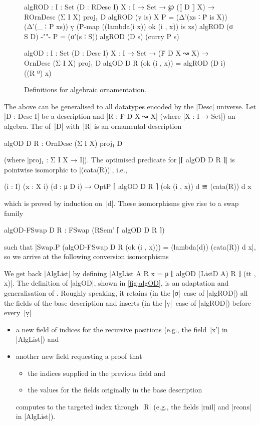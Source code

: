 \begin{figure}
\codefigure
\begin{code}
algROD :  {I : Set} (D : RDesc I) {X : I → Set} →
          ℘ (⟦ D ⟧ X) → ROrnDesc (Σ I X) proj₁ D
algROD (ṿ is)   {X}     P =  (Δ'(xs ∶ Ṗ is X)) (Δ'(_ ∶ P xs))
                               ṿ (Ṗ-map ((lambda({i} x)) ok (i , x)) is xs)
algROD (σ S D)  {-""-}  P =  (σ'(s ∶ S)) algROD (D s) (curry P s)

algOD :  {I : Set} (D : Desc I) {X : I → Set} →
         (Ḟ D X ↝ X) → OrnDesc (Σ I X) proj₁ D
algOD D R (ok (i , x)) = algROD (D i) ((R º) x)
\end{code}
\caption{Definitions for algebraic ornamentation.}
\label{fig:algOD}
\end{figure}

The above can be generalised to all datatypes encoded by the |Desc| universe.
Let |D : Desc I| be a description and |R : Ḟ D X ↝ X| (where |X : I → Set|) an algebra.
The  of~|D| with~|R| is an ornamental description
\begin{code}
algOD D R : OrnDesc (Σ I X) proj₁ D
\end{code}
(where |proj₁ : Σ I X → I|).
The optimised predicate for |⌈ algOD D R ⌉| is pointwise isomorphic to |(cata(R))|, i.e.,
\begin{code}
(i : I) (x : X i) (d : μ D i) → OptP ⌈ algOD D R ⌉ (ok (i , x)) d ≅ (cata(R)) d x
\end{code}
which is proved by induction on~|d|.
These isomorphisms give rise to a swap family
\begin{code}
algOD-FSwap D R : FSwap (RSem' ⌈ algOD D R ⌉)
\end{code}
such that |Swap.P (algOD-FSwap D R (ok (i , x))) = (lambda(d)) (cata(R)) d x|, so we arrive at the following conversion isomorphisms
We get back |AlgList| by defining |AlgList A R x = μ ⌊ algOD (ListD A) R ⌋ (tt , x)|.
The definition of |algOD|, shown in \autoref{fig:algOD}, is an adaptation and generalisation of .
Roughly speaking, it retains (in the |σ|~case of |algROD|) all the fields of the base description and inserts (in the |ṿ|~case of |algROD|) before every~|ṿ|
\begin{itemize}
\item a new field of indices for the recursive positions (e.g., the field~|x'| in |AlgList|) and
\item another new field requesting a proof that
\begin{itemize}
\item the indices supplied in the previous field and 
\item the values for the fields originally in the base description
\end{itemize}
computes to the targeted index through~|R| (e.g., the fields |rnil| and |rcons| in |AlgList|).
\end{itemize}

